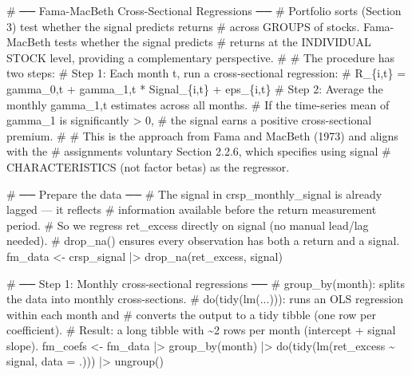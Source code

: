 \documentclass[
  letterpaper,
  DIV=11,
  numbers=noendperiod]{scrartcl}
\newenvironment{Shaded}{\begin{snugshade}}{\end{snugshade}}
\newcommand{\AttributeTok}[1]{\textcolor[rgb]{0.40,0.45,0.13}{#1}}
\newcommand{\CommentTok}[1]{\textcolor[rgb]{0.37,0.37,0.37}{#1}}
\newcommand{\FunctionTok}[1]{\textcolor[rgb]{0.28,0.35,0.67}{#1}}
\newcommand{\NormalTok}[1]{\textcolor[rgb]{0.00,0.23,0.31}{#1}}
\newcommand{\OtherTok}[1]{\textcolor[rgb]{0.00,0.23,0.31}{#1}}
\newcommand{\SpecialCharTok}[1]{\textcolor[rgb]{0.37,0.37,0.37}{#1}}
\begin{document}
\begin{Shaded}
\begin{Highlighting}[]
\CommentTok{\# ── Fama{-}MacBeth Cross{-}Sectional Regressions ──}
\CommentTok{\# Portfolio sorts (Section 3) test whether the signal predicts returns}
\CommentTok{\# across GROUPS of stocks. Fama{-}MacBeth tests whether the signal predicts}
\CommentTok{\# returns at the INDIVIDUAL STOCK level, providing a complementary perspective.}
\CommentTok{\#}
\CommentTok{\# The procedure has two steps:}
\CommentTok{\#   Step 1: Each month t, run a cross{-}sectional regression:}
\CommentTok{\#           R\_\{i,t\} = gamma\_0,t + gamma\_1,t * Signal\_\{i,t\} + eps\_\{i,t\}}
\CommentTok{\#   Step 2: Average the monthly gamma\_1,t estimates across all months.}
\CommentTok{\#           If the time{-}series mean of gamma\_1 is significantly \textgreater{} 0,}
\CommentTok{\#           the signal earns a positive cross{-}sectional premium.}
\CommentTok{\#}
\CommentTok{\# This is the approach from Fama and MacBeth (1973) and aligns with the}
\CommentTok{\# assignment\textquotesingle{}s voluntary Section 2.2.6, which specifies using signal}
\CommentTok{\# CHARACTERISTICS (not factor betas) as the regressor.}

\CommentTok{\# ── Prepare the data ──}
\CommentTok{\# The signal in crsp\_monthly\_signal is already lagged — it reflects}
\CommentTok{\# information available before the return measurement period.}
\CommentTok{\# So we regress ret\_excess directly on signal (no manual lead/lag needed).}
\CommentTok{\# drop\_na() ensures every observation has both a return and a signal.}
\NormalTok{fm\_data }\OtherTok{\textless{}{-}}\NormalTok{ crsp\_signal }\SpecialCharTok{|\textgreater{}}
  \FunctionTok{drop\_na}\NormalTok{(ret\_excess, signal)}

\CommentTok{\# ── Step 1: Monthly cross{-}sectional regressions ──}
\CommentTok{\# group\_by(month): splits the data into monthly cross{-}sections.}
\CommentTok{\# do(tidy(lm(...))): runs an OLS regression within each month and}
\CommentTok{\#   converts the output to a tidy tibble (one row per coefficient).}
\CommentTok{\# Result: a long tibble with \textasciitilde{}2 rows per month (intercept + signal slope).}
\NormalTok{fm\_coefs }\OtherTok{\textless{}{-}}\NormalTok{ fm\_data }\SpecialCharTok{|\textgreater{}}
  \FunctionTok{group\_by}\NormalTok{(month) }\SpecialCharTok{|\textgreater{}}
  \FunctionTok{do}\NormalTok{(}\FunctionTok{tidy}\NormalTok{(}\FunctionTok{lm}\NormalTok{(ret\_excess }\SpecialCharTok{\textasciitilde{}}\NormalTok{ signal, }\AttributeTok{data =}\NormalTok{ .))) }\SpecialCharTok{|\textgreater{}}
  \FunctionTok{ungroup}\NormalTok{()}


\end{Highlighting}
\end{Shaded}
\end{document}
